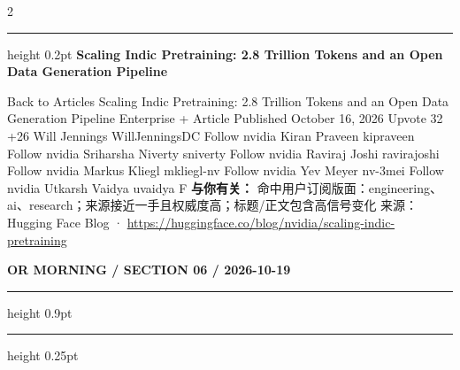 \documentclass[10.5pt]{ctexart}
\begin{document}
\begin{multicols}{2}
\vspace{2mm}
\hrule height 0.2pt
\vspace{2mm}
{\large\bfseries Scaling Indic Pretraining: 2.8 Trillion Tokens and an Open Data Generation Pipeline}\par
Back to Articles Scaling Indic Pretraining: 2.8 Trillion Tokens and an Open Data Generation Pipeline Enterprise + Article Published October 16, 2026 Upvote 32 +26 Will Jennings WillJenningsDC Follow nvidia Kiran Praveen kipraveen Follow nvidia Sriharsha Niverty sniverty Follow nvidia Raviraj Joshi ravirajoshi Follow nvidia Markus Kliegl mkliegl-nv Follow nvidia Yev Meyer nv-3mei Follow nvidia Utkarsh Vaidya uvaidya F
\textbf{与你有关：} 命中用户订阅版面：engineering、ai、research；来源接近一手且权威度高；标题/正文包含高信号变化
{\footnotesize\color{ormuted} 来源：Hugging Face Blog · \url{https://huggingface.co/blog/nvidia/scaling-indic-pretraining}}
\end{multicols}
\newpage
{\small\bfseries OR MORNING / SECTION 06 / 2026-10-19}
\vspace{2mm}
\hrule height 0.9pt
\vspace{1.5mm}
\hrule height 0.25pt
\vspace{4mm}
\end{document}

